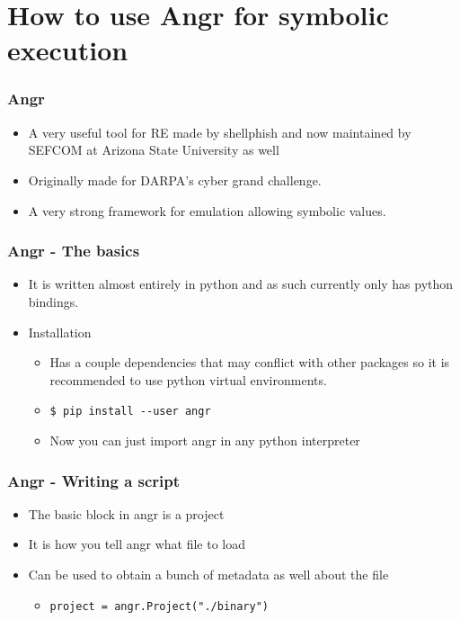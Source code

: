 \documentclass[aspectratio=169]{beamer}
\begin{document}
\section{How to use Angr for symbolic execution}

\begin{frame}[fragile]
\frametitle{Angr}
\begin{itemize}
\item A very useful tool for RE made by shellphish and now maintained by SEFCOM at Arizona State University as well
\item Originally made for DARPA’s cyber grand challenge.
\item A very strong framework for emulation allowing symbolic values.
\end{itemize}
\end{frame}

\begin{frame}[fragile]
\frametitle{Angr - The basics}
\begin{itemize}
\item It is written almost entirely in python and as such currently only has python bindings.
\item Installation
\begin{itemize}
\item Has a couple dependencies that may conflict with other packages so it is recommended to use python virtual environments.
\item \verb|$ pip install --user angr|
\item Now you can just import angr in any python interpreter
\end{itemize}
\end{itemize}
\end{frame}

\begin{frame}[fragile]
\frametitle{Angr - Writing a script}
\begin{itemize}
\item The basic block in angr is a project
\item It is how you tell angr what file to load
\item Can be used to obtain a bunch of metadata as well about the file
\begin{itemize}
\item \verb|project = angr.Project("./binary")|
\end{itemize}
\end{itemize}
\end{frame}
\end{document}
